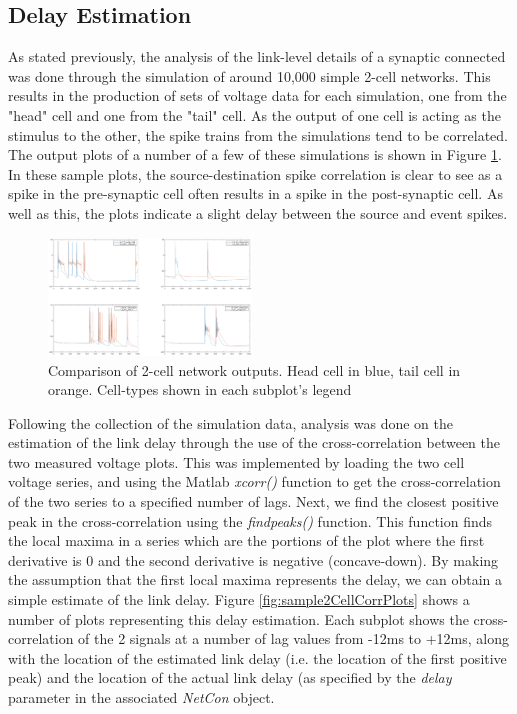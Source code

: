 \documentclass[letterpaper, 10 pt, conference]{ieeeconf}  %
\begin{document}
\subsection*{Delay Estimation}
As stated previously, the analysis of the link-level details of a synaptic connected was done through the simulation of around 10,000 simple 2-cell networks. This results in the production of sets of voltage data for each simulation, one from the "head" cell and one from the "tail" cell. As the output of one cell is acting as the stimulus to the other, the spike trains from the simulations tend to be correlated. The output plots of a number of a few of these simulations is shown in Figure \ref{fig:sample2CellPlots}. In these sample plots, the source-destination spike correlation is clear to see as a spike in the pre-synaptic cell often results in a spike in the post-synaptic cell. As well as this, the plots indicate a slight delay between the source and event spikes.
\begin{figure}[ht]
    \centering
    \includegraphics[width=0.48\textwidth]{2cellComp.png}
    \caption{Comparison of 2-cell network outputs. Head cell in blue, tail cell in orange. Cell-types shown in each subplot's legend}
    \label{fig:sample2CellPlots}
\end{figure}

\par

Following the collection of the simulation data, analysis was done on the estimation of the link delay through the use of the cross-correlation between the two measured voltage plots. This was implemented by loading the two cell voltage series, and using the Matlab \emph{xcorr()} function to get the cross-correlation of the two series to a specified number of lags. Next, we find the closest positive peak in the cross-correlation using the \emph{findpeaks()} function. This function finds the local maxima in a series which are the portions of the plot where the first derivative is 0 and the second derivative is negative (concave-down). By making the assumption that the first local maxima represents the delay, we can obtain a simple estimate of the link delay. Figure \ref{fig:sample2CellCorrPlots} shows a number of plots representing this delay estimation. Each subplot shows the cross-correlation of the 2 signals at a number of lag values from -12ms to +12ms, along with the location of the estimated link delay (i.e. the location of the first positive peak) and the location of the actual link delay (as specified by the \emph{delay} parameter in the associated \emph{NetCon} object.\\
\end{document}
